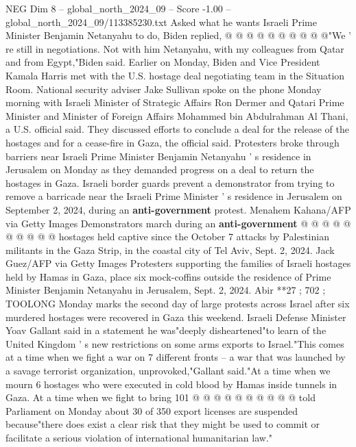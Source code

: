 \begin{textsample}{NEG Dim 8 – global\_north\_2024\_09 – Score -1.00 – global\_north\_2024\_09/113385230.txt}
Asked what he wants Israeli Prime Minister Benjamin Netanyahu to do, Biden replied, @ @ @ @ @ @ @ @ @ @"We ' re still in negotiations.
Not with him Netanyahu, with my colleagues from Qatar and from Egypt,"Biden said.
Earlier on Monday, Biden and Vice President Kamala Harris met with the U.S. hostage deal negotiating team in the Situation Room.
National security adviser Jake Sullivan spoke on the phone Monday morning with Israeli Minister of Strategic Affairs Ron Dermer and Qatari Prime Minister and Minister of Foreign Affairs Mohammed bin Abdulrahman Al Thani, a U.S. official said.
They discussed efforts to conclude a deal for the release of the hostages and for a cease-fire in Gaza, the official said.
Protesters broke through barriers near Israeli Prime Minister Benjamin Netanyahu ' s residence in Jerusalem on Monday as they demanded progress on a deal to return the hostages in Gaza.
Israeli border guards prevent a demonstrator from trying to remove a barricade near the Israeli Prime Minister ' s residence in Jerusalem on September 2, 2024, during an \textbf{anti-government} protest.
Menahem Kahana/AFP via Getty Images Demonstrators march during an \textbf{anti-government} @ @ @ @ @ @ @ @ @ @ hostages held captive since the October 7 attacks by Palestinian militants in the Gaza Strip, in the coastal city of Tel Aviv, Sept. 2, 2024.
Jack Guez/AFP via Getty Images Protesters supporting the families of Israeli hostages held by Hamas in Gaza, place six mock-coffins outside the residence of Prime Minister Benjamin Netanyahu in Jerusalem, Sept. 2, 2024.
Abir **27 ; 702 ; TOOLONG Monday marks the second day of large protests across Israel after six murdered hostages were recovered in Gaza this weekend.
Israeli Defense Minister Yoav Gallant said in a statement he was"deeply disheartened"to learn of the United Kingdom ' s new restrictions on some arms exports to Israel."This comes at a time when we fight a war on 7 different fronts -- a war that was launched by a savage terrorist organization, unprovoked,"Gallant said."At a time when we mourn 6 hostages who were executed in cold blood by Hamas inside tunnels in Gaza.
At a time when we fight to bring 101 @ @ @ @ @ @ @ @ @ @ told Parliament on Monday about 30 of 350 export licenses are suspended because"there does exist a clear risk that they might be used to commit or facilitate a serious violation of international humanitarian law."

\end{textsample}
